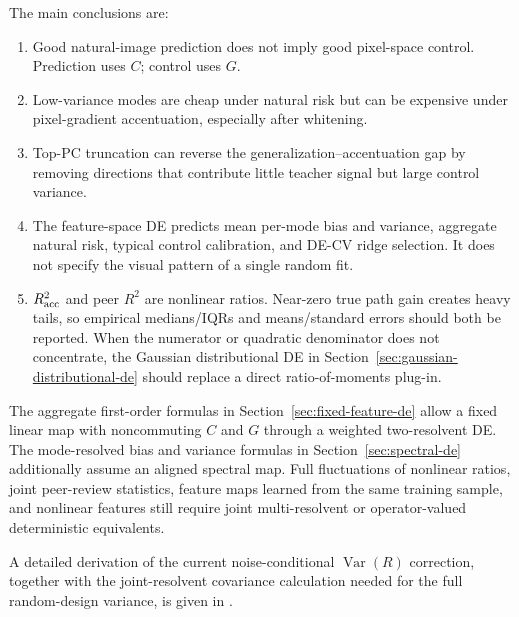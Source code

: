 \documentclass[11pt]{article}
\begin{document}
The main conclusions are:
\begin{enumerate}
  \item Good natural-image prediction does not imply good pixel-space
        control.  Prediction uses $C$; control uses $G$.
  \item Low-variance modes are cheap under natural risk but can be expensive
        under pixel-gradient accentuation, especially after whitening.
  \item Top-PC truncation can reverse the generalization--accentuation gap by
        removing directions that contribute little teacher signal but large
        control variance.
  \item The feature-space DE predicts mean per-mode bias and variance,
        aggregate natural risk, typical control calibration, and DE-CV ridge
        selection.  It does not specify the visual pattern of a single random
        fit.
  \item $R^2_{\rm acc}$ and peer $R^2$ are nonlinear ratios.  Near-zero true
        path gain creates heavy tails, so empirical medians/IQRs and
        means/standard errors should both be reported.  When the numerator or
        quadratic denominator does not concentrate, the Gaussian
        distributional DE in Section~\ref{sec:gaussian-distributional-de}
        should replace a direct ratio-of-moments plug-in.
\end{enumerate}

The aggregate first-order formulas in
Section~\ref{sec:fixed-feature-de} allow a fixed linear map with noncommuting
$C$ and $G$ through a weighted two-resolvent DE.  The mode-resolved bias and
variance formulas in Section~\ref{sec:spectral-de} additionally assume an
aligned spectral map.  Full fluctuations of nonlinear ratios, joint
peer-review statistics, feature maps learned from the same training sample,
and nonlinear features still require joint multi-resolvent or operator-valued
deterministic equivalents.

A detailed derivation of the current noise-conditional
$\operatorname{Var}(R)$ correction, together with the joint-resolvent
covariance calculation needed for the full random-design variance, is given in
.
\end{document}
